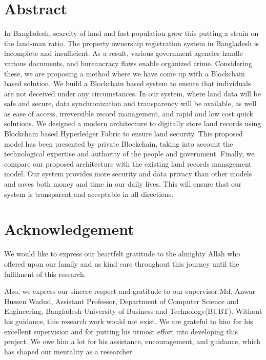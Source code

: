 \documentclass[12pt]{ucthesis}
\begin{document}
\begin{frontmatter}



\chapter*{Abstract}
    
    In Bangladesh, scarcity of land and fast population grow this putting a strain on the land-man ratio. The property ownership registration system in Bangladesh is incomplete and insufficient. As a result, various government agencies handle various documents, and bureaucracy flaws enable organized crime. Considering these, we are proposing a method where we have come up with a Blockchain based solution. We build a Blockchain based system to ensure that individuals are not deceived under any circumstances. In our system, where land data will be safe  and  secure,  data  synchronization  and  transparency  will  be  available, as well as ease of access, irreversible record management, and rapid and low cost quick solutions. We designed a modern architecture to digitally store land records using Blockchain based Hyperledger Fabric to ensure land security. This proposed model has been presented by private Blockchain, taking into account the technological expertise and authority of the people and government. Finally, we compare our proposed architecture with the existing land records management model. Our system provides  more  security  and  data  privacy  than  other  models  and  saves both money and time in our daily lives. This will ensure that our system is transparent and acceptable in all directions.


\declaration
 

\chapter*{Acknowledgement}
    We would like to express our heartfelt gratitude to the almighty Allah who offered upon our family and us kind care throughout this journey until the fulfilment of this research.

    Also, we express our sincere respect and gratitude to our supervisor Md. Anwar Hussen Wadud, Assistant Professor, Department of Computer Science and Engineering, Bangladesh University of Business and Technology(BUBT). Without his guidance, this research work would not exist. We are grateful to him for his excellent supervision and for putting his utmost effort into developing this project. We owe him a lot for his assistance, encouragement, and guidance, which has shaped our mentality as a researcher.


\end{frontmatter}
\end{document}
